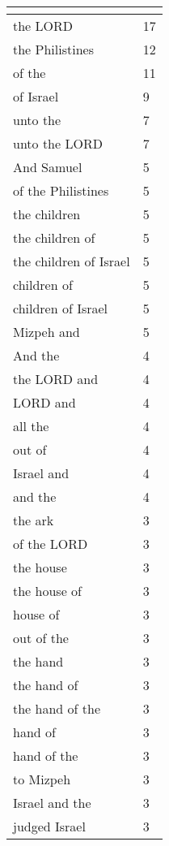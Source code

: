 \begin{center}
\begin{longtable}{|p{3.0in}|p{0.5in}|}
\hline \multicolumn{2}{c}{{ }} \\ \hline
\endfoot 
the LORD & 17\\ \hline 
the Philistines & 12\\ \hline 
of the & 11\\ \hline 
of Israel & 9\\ \hline 
unto the & 7\\ \hline 
unto the LORD & 7\\ \hline 
And Samuel & 5\\ \hline 
of the Philistines & 5\\ \hline 
the children & 5\\ \hline 
the children of & 5\\ \hline 
the children of Israel & 5\\ \hline 
children of & 5\\ \hline 
children of Israel & 5\\ \hline 
Mizpeh and & 5\\ \hline 
And the & 4\\ \hline 
the LORD and & 4\\ \hline 
LORD and & 4\\ \hline 
all the & 4\\ \hline 
out of & 4\\ \hline 
Israel and & 4\\ \hline 
and the & 4\\ \hline 
the ark & 3\\ \hline 
of the LORD & 3\\ \hline 
the house & 3\\ \hline 
the house of & 3\\ \hline 
house of & 3\\ \hline 
out of the & 3\\ \hline 
the hand & 3\\ \hline 
the hand of & 3\\ \hline 
the hand of the & 3\\ \hline 
hand of & 3\\ \hline 
hand of the & 3\\ \hline 
to Mizpeh & 3\\ \hline 
Israel and the & 3\\ \hline 
judged Israel & 3\\ \hline 
\end{longtable}
\end{center}





